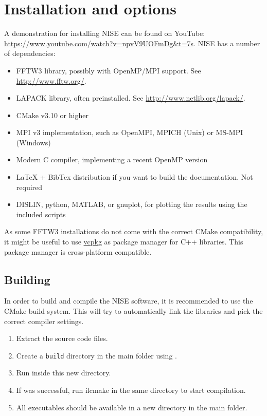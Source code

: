 \chapter{Installation and options}
A demonstration for installing NISE can be found on YouTube: \url{https://www.youtube.com/watch?v=npvV9UOFmDg&t=7s}.
NISE has a number of dependencies:
\begin{itemize}
\item FFTW3 library, possibly with OpenMP/MPI support. See \url{http://www.fftw.org/}.
\item LAPACK library, often preinstalled. See \url{http://www.netlib.org/lapack/}.
\item CMake v3.10 or higher
\item MPI v3 implementation, such as OpenMPI, MPICH (Unix) or MS-MPI (Windows)
\item Modern C compiler, implementing a recent OpenMP version
\item LaTeX + BibTex distribution if you want to build the documentation. Not required
\item DISLIN, python, MATLAB, or gnuplot, for plotting the results using the included scripts
\end{itemize}
As some FFTW3 installations do not come with the correct CMake compatibility, it might be useful to use \href{https://github.com/microsoft/vcpkg}{vcpkg} as package manager for C++ libraries. This package manager is cross-platform compatible.

\section{Building}
In order to build and compile the NISE software, it is recommended to use the CMake build system. This will try to automatically link the libraries and pick the correct compiler settings.
\begin{enumerate}
\item Extract the source code files.
\item Create a \texttt{build} directory in the main folder using .
\item Run  inside this new  directory.
\item If  was successful, run ilc{make} in the same directory to start compilation.
\item All executables should be available in a new  directory in the main folder.
\end{enumerate}

